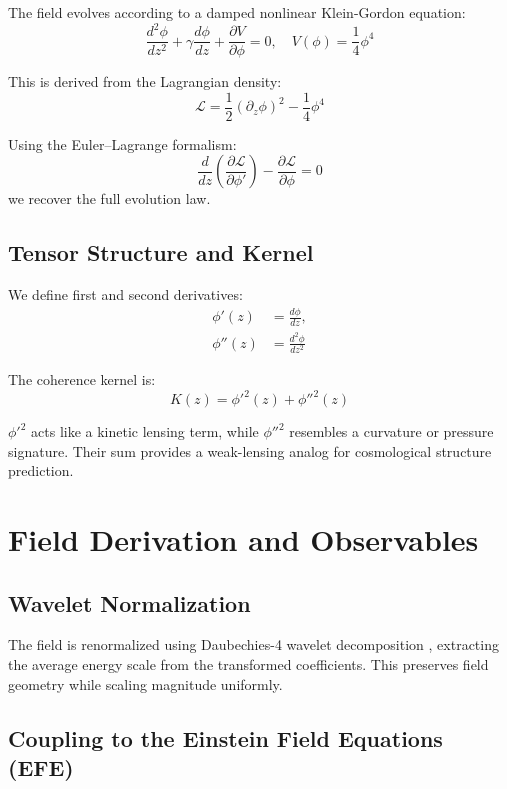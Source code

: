 \documentclass[12pt]{article}
\begin{document}
The field evolves according to a damped nonlinear Klein-Gordon equation:
\begin{equation}
\frac{d^2 \phi}{dz^2} + \gamma \frac{d\phi}{dz} + \frac{\partial V}{\partial \phi} = 0, \quad V(\phi) = \frac{1}{4} \phi^4
\end{equation}

This is derived from the Lagrangian density:
\begin{equation}
\mathcal{L} = \frac{1}{2}(\partial_z \phi)^2 - \frac{1}{4} \phi^4
\end{equation}

Using the Euler–Lagrange formalism:
\begin{equation}
\frac{d}{dz}\left(\frac{\partial \mathcal{L}}{\partial \phi'}\right) - \frac{\partial \mathcal{L}}{\partial \phi} = 0
\end{equation}
we recover the full evolution law.

\subsection{Tensor Structure and Kernel}
We define first and second derivatives:
\begin{align}
\phi'(z) &= \frac{d\phi}{dz}, \\
\phi''(z) &= \frac{d^2\phi}{dz^2}
\end{align}

The coherence kernel is:
\begin{equation}
K(z) = \phi'^2(z) + \phi''^2(z)
\end{equation}

\( \phi'^2 \) acts like a kinetic lensing term, while \( \phi''^2 \) resembles a curvature or pressure signature. Their sum provides a weak-lensing analog for cosmological structure prediction.

\section{Field Derivation and Observables}
\subsection{Wavelet Normalization}
The field is renormalized using Daubechies-4 wavelet decomposition \cite{daubechies}, extracting the average energy scale from the transformed coefficients. This preserves field geometry while scaling magnitude uniformly.

\subsection*{Coupling to the Einstein Field Equations (EFE)}
\end{document}
